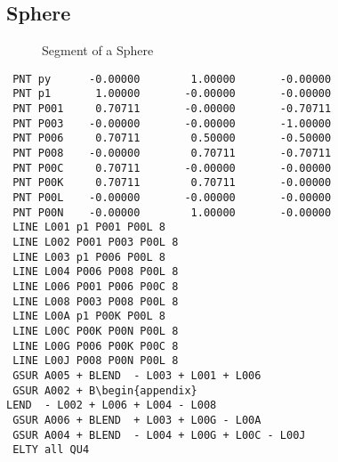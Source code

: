\documentclass{article}
\begin{document}
\begin{appendix}
\subsection{\label{Sphere}Sphere}
\begin{figure}[h]
\caption{\label{Segment of a Sphere}Segment of a Sphere}
\end{figure}
\begin{verbatim}
 PNT py      -0.00000        1.00000       -0.00000 
 PNT p1       1.00000       -0.00000       -0.00000 
 PNT P001     0.70711       -0.00000       -0.70711 
 PNT P003    -0.00000       -0.00000       -1.00000 
 PNT P006     0.70711        0.50000       -0.50000 
 PNT P008    -0.00000        0.70711       -0.70711 
 PNT P00C     0.70711       -0.00000       -0.00000 
 PNT P00K     0.70711        0.70711       -0.00000 
 PNT P00L    -0.00000       -0.00000       -0.00000 
 PNT P00N    -0.00000        1.00000       -0.00000 
 LINE L001 p1 P001 P00L 8              
 LINE L002 P001 P003 P00L 8              
 LINE L003 p1 P006 P00L 8              
 LINE L004 P006 P008 P00L 8              
 LINE L006 P001 P006 P00C 8              
 LINE L008 P003 P008 P00L 8              
 LINE L00A p1 P00K P00L 8              
 LINE L00C P00K P00N P00L 8              
 LINE L00G P006 P00K P00C 8              
 LINE L00J P008 P00N P00L 8              
 GSUR A005 + BLEND  - L003 + L001 + L006 
 GSUR A002 + B\begin{appendix}
LEND  - L002 + L006 + L004 - L008 
 GSUR A006 + BLEND  + L003 + L00G - L00A 
 GSUR A004 + BLEND  - L004 + L00G + L00C - L00J 
 ELTY all QU4 
\end{verbatim}



\end{appendix}
\end{document}
